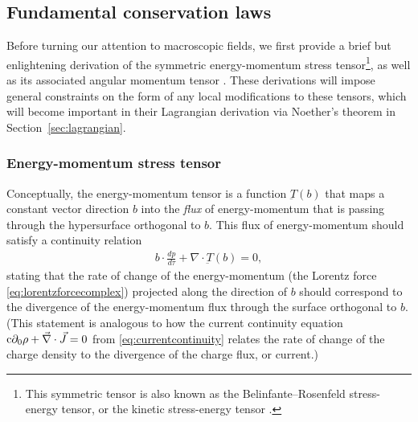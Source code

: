 \documentclass[1p,sort&compress]{elsarticle}
\numberwithin{equation}{section}
\newcommand{\rv}[1]{\vec{#1}}
\newcommand{\cc}{{\rm c}}
\begin{document}
\subsection{Fundamental conservation laws}\label{sec:symtensor}


Before turning our attention to macroscopic fields, we first provide a brief but enlightening derivation of the symmetric energy-momentum stress tensor\footnote{This symmetric tensor is also known as the Belinfante--Rosenfeld stress-energy tensor, or the kinetic stress-energy tensor \cite{Soper1976,Thide2014,Bliokh2013,Leader2014}.}, as well as its associated angular momentum tensor \cite{Thide2014,Soper1976}.  These derivations will impose general constraints on the form of any local modifications to these tensors, which will become important in their Lagrangian derivation via Noether's theorem in Section~\ref{sec:lagrangian}.


\subsubsection{Energy-momentum stress tensor}\label{sec:symemstress}


Conceptually, the energy-momentum tensor is a function $\underbar{T}(b)$ that maps a constant vector direction $b$ into the \emph{flux} of energy-momentum that is passing through the hypersurface orthogonal to $b$.  This flux of energy-momentum should satisfy a continuity relation 
\begin{align}\label{eq:energymomentumcontinuity}
  b\cdot \frac{dp}{d\tau} + \nabla\cdot\underbar{T}(b) = 0,
\end{align}
stating that the rate of change of the energy-momentum (the Lorentz force \eqref{eq:lorentzforcecomplex}) projected along the direction of $b$ should correspond to the divergence of the energy-momentum flux through the surface orthogonal to $b$.  (This statement is analogous to how the current continuity equation $\cc\partial_0\rho + \rv{\nabla}\cdot\rv{J} = 0$ from \eqref{eq:currentcontinuity} relates the rate of change of the charge density to the divergence of the charge flux, or current.)
\end{document}
